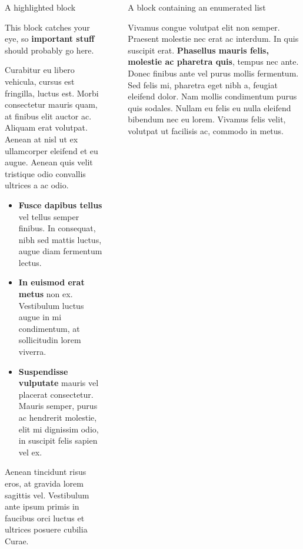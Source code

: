 \documentclass[final]{beamer}
\newlength{\sepwidth}
\newlength{\colwidth}
\newcommand{\separatorcolumn}{\begin{column}{\sepwidth}\end{column}}
\begin{document}
\begin{frame}[t]
\begin{columns}[t]
\begin{column}{\colwidth}
      \begin{alertblock}{A highlighted block}

        This block catches your eye, so \textbf{important stuff} should probably go
        here.

        Curabitur eu libero vehicula, cursus est fringilla, luctus est. Morbi
        consectetur mauris quam, at finibus elit auctor ac. Aliquam erat volutpat.
        Aenean at nisl ut ex ullamcorper eleifend et eu augue. Aenean quis velit
        tristique odio convallis ultrices a ac odio.

        \begin{itemize}
          \item \textbf{Fusce dapibus tellus} vel tellus semper finibus. In
                consequat, nibh sed mattis luctus, augue diam fermentum lectus.
          \item \textbf{In euismod erat metus} non ex. Vestibulum luctus augue in
                mi condimentum, at sollicitudin lorem viverra.
          \item \textbf{Suspendisse vulputate} mauris vel placerat consectetur.
                Mauris semper, purus ac hendrerit molestie, elit mi dignissim odio, in
                suscipit felis sapien vel ex.
        \end{itemize}

        Aenean tincidunt risus eros, at gravida lorem sagittis vel. Vestibulum ante
        ipsum primis in faucibus orci luctus et ultrices posuere cubilia Curae.

      \end{alertblock}

    \end{column}

    \separatorcolumn

    \begin{column}{\colwidth}

      \begin{block}{A block containing an enumerated list}

        Vivamus congue volutpat elit non semper. Praesent molestie nec erat ac
        interdum. In quis suscipit erat. \textbf{Phasellus mauris felis, molestie
          ac pharetra quis}, tempus nec ante. Donec finibus ante vel purus mollis
        fermentum. Sed felis mi, pharetra eget nibh a, feugiat eleifend dolor. Nam
        mollis condimentum purus quis sodales. Nullam eu felis eu nulla eleifend
        bibendum nec eu lorem. Vivamus felis velit, volutpat ut facilisis ac,
        commodo in metus.


\end{block}
\end{column}
\end{columns}
\end{frame}
\end{document}

